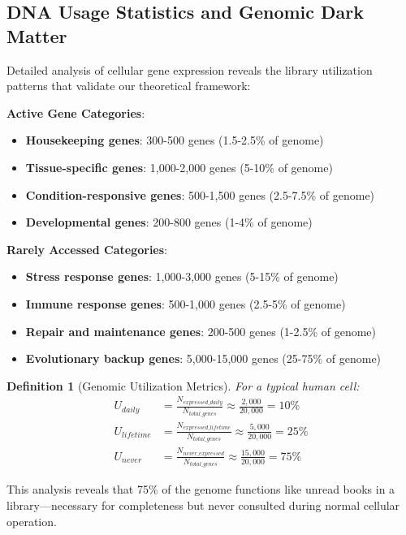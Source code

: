 \documentclass[12pt,a4paper]{article}
\newtheorem{definition}[theorem]{Definition}
\begin{document}
\subsection{DNA Usage Statistics and Genomic Dark Matter}

Detailed analysis of cellular gene expression reveals the library utilization patterns that validate our theoretical framework:

\textbf{Active Gene Categories}:
\begin{itemize}
\item \textbf{Housekeeping genes}: 300-500 genes (1.5-2.5\% of genome)
\item \textbf{Tissue-specific genes}: 1,000-2,000 genes (5-10\% of genome)
\item \textbf{Condition-responsive genes}: 500-1,500 genes (2.5-7.5\% of genome)
\item \textbf{Developmental genes}: 200-800 genes (1-4\% of genome)
\end{itemize}

\textbf{Rarely Accessed Categories}:
\begin{itemize}
\item \textbf{Stress response genes}: 1,000-3,000 genes (5-15\% of genome)
\item \textbf{Immune response genes}: 500-1,000 genes (2.5-5\% of genome)
\item \textbf{Repair and maintenance genes}: 200-500 genes (1-2.5\% of genome)
\item \textbf{Evolutionary backup genes}: 5,000-15,000 genes (25-75\% of genome)
\end{itemize}

\begin{definition}[Genomic Utilization Metrics]
For a typical human cell:
$$\begin{aligned}
U_{daily} &= \frac{N_{expressed\_daily}}{N_{total\_genes}} \approx \frac{2,000}{20,000} = 10\% \\
U_{lifetime} &= \frac{N_{expressed\_lifetime}}{N_{total\_genes}} \approx \frac{5,000}{20,000} = 25\% \\
U_{never} &= \frac{N_{never\_expressed}}{N_{total\_genes}} \approx \frac{15,000}{20,000} = 75\%
\end{aligned}$$
\end{definition}

This analysis reveals that 75\% of the genome functions like unread books in a library—necessary for completeness but never consulted during normal cellular operation.
\end{document}
